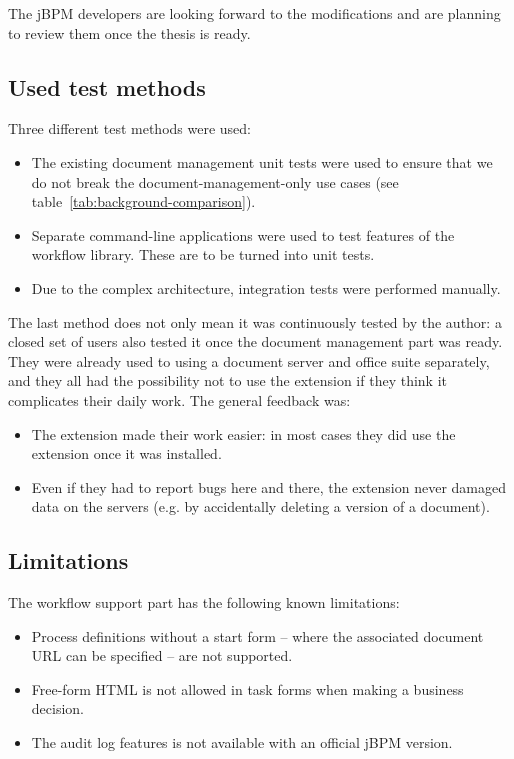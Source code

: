 The jBPM developers are looking forward to the modifications and are planning
to review them once the thesis is ready.

\subsection*{Used test methods}

Three different test methods were used:

\begin{itemize}
\item The existing document management unit tests were used to ensure that we do not break the document-management-only use cases (see table~\ref{tab:background-comparison}).
\item Separate command-line applications were used to test features of the workflow library. These are to be turned into unit tests.
\item Due to the complex architecture, integration tests were performed manually.
\end{itemize}

The last method does not only mean it was continuously tested by the author: a closed set of users also tested it once the document management part was ready. They were already used to using a document server and office suite separately, and they all had the possibility not to use the extension if they think it complicates their daily work. The general feedback was:

\begin{itemize}
\item The extension made their work easier: in most cases they did use the extension once it was installed.
\item Even if they had to report bugs here and there, the extension never
damaged data on the servers (e.g. by accidentally deleting a version of a
document).
\end{itemize}

\subsection*{Limitations}

The workflow support part has the following known limitations:

\begin{itemize}
\item Process definitions without a start form -- where the associated document URL can be specified -- are not supported.
\item Free-form HTML is not allowed in task forms when making a business decision.
\item The audit log features is not available with an official jBPM version.
\end{itemize}

